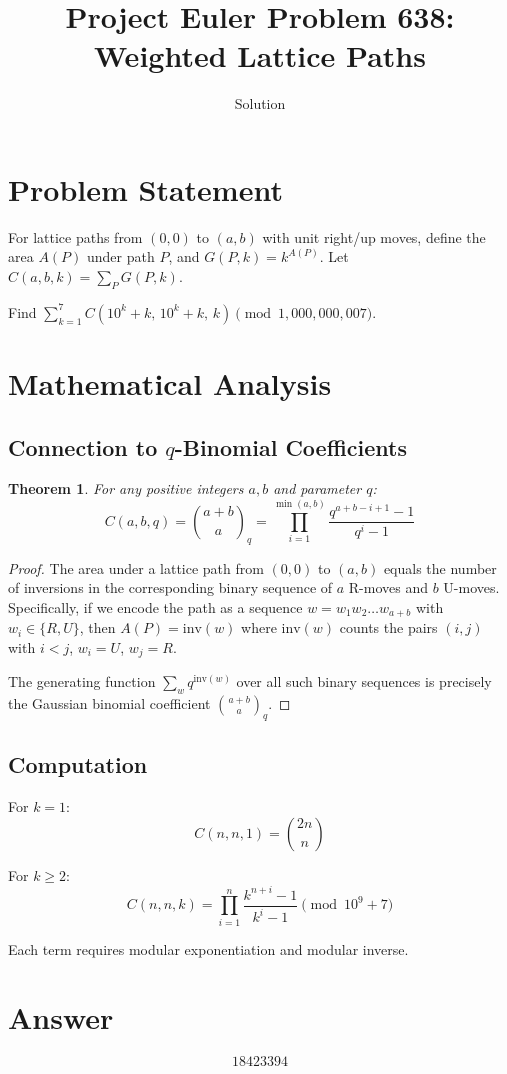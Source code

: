 \documentclass[12pt]{article}
\title{Project Euler Problem 638: Weighted Lattice Paths}
\author{Solution}
\date{}
\newtheorem{theorem}{Theorem}
\theoremstyle{definition}
\begin{document}
\maketitle

\section{Problem Statement}

For lattice paths from $(0,0)$ to $(a,b)$ with unit right/up moves, define the area $A(P)$ under path $P$, and $G(P,k) = k^{A(P)}$. Let $C(a,b,k) = \sum_P G(P,k)$.

Find $\displaystyle\sum_{k=1}^{7} C(10^k+k,\, 10^k+k,\, k) \pmod{1{,}000{,}000{,}007}$.

\section{Mathematical Analysis}

\subsection{Connection to $q$-Binomial Coefficients}

\begin{theorem}
For any positive integers $a, b$ and parameter $q$:
\[
C(a,b,q) = \binom{a+b}{a}_q = \prod_{i=1}^{\min(a,b)} \frac{q^{a+b-i+1}-1}{q^i - 1}
\]
\end{theorem}

\begin{proof}
The area under a lattice path from $(0,0)$ to $(a,b)$ equals the number of inversions in the corresponding binary sequence of $a$ R-moves and $b$ U-moves. Specifically, if we encode the path as a sequence $w = w_1 w_2 \ldots w_{a+b}$ with $w_i \in \{R, U\}$, then $A(P) = \text{inv}(w)$ where $\text{inv}(w)$ counts the pairs $(i,j)$ with $i < j$, $w_i = U$, $w_j = R$.

The generating function $\sum_w q^{\text{inv}(w)}$ over all such binary sequences is precisely the Gaussian binomial coefficient $\binom{a+b}{a}_q$.
\end{proof}

\subsection{Computation}

For $k = 1$:
\[
C(n,n,1) = \binom{2n}{n}
\]

For $k \ge 2$:
\[
C(n,n,k) = \prod_{i=1}^{n} \frac{k^{n+i} - 1}{k^i - 1} \pmod{10^9+7}
\]

Each term requires modular exponentiation and modular inverse.

\section{Answer}

\[
\boxed{18423394}
\]
\end{document}
